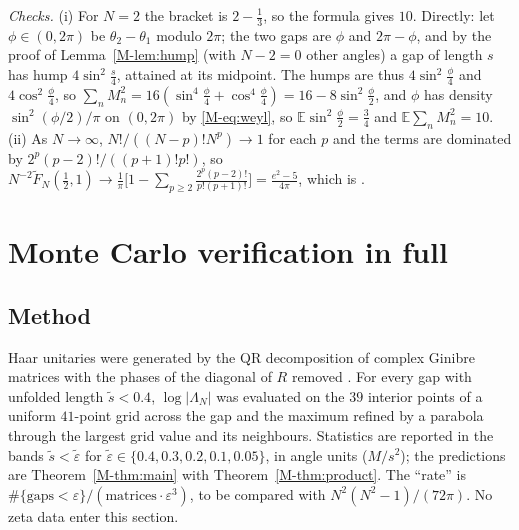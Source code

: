 \documentclass[12pt]{amsart}
\theoremstyle{remark}
\newcommand{\E}{\mathbb{E}}
\newcommand{\eps}{\varepsilon}
\newcommand{\1}{\mathbf{1}}
\begin{document}
\emph{Checks.} (i) For $N=2$ the bracket is $2-\frac13$, so the formula
gives $10$. Directly: let $\phi\in(0,2\pi)$ be $\theta_2-\theta_1$ modulo
$2\pi$; the two gaps are $\phi$ and $2\pi-\phi$, and by
the proof of Lemma~\ref{M-lem:hump} (with $N-2=0$ other angles) a gap of length $s$ has
hump $4\sin^2\frac s4$, attained at its midpoint. The humps are thus
$4\sin^2\frac\phi4$ and $4\cos^2\frac\phi4$, so
$\sum_nM_n^2=16(\sin^4\frac\phi4+\cos^4\frac\phi4)=16-8\sin^2\frac\phi2$,
and $\phi$ has density $\sin^2(\phi/2)/\pi$ on $(0,2\pi)$ by
\eqref{M-eq:weyl}, so $\E\sin^2\frac\phi2=\frac34$ and $\E\sum_nM_n^2=10$.
(ii) As $N\to\infty$, $N!/((N-p)!N^p)\to1$ for each $p$ and the terms are
dominated by $2^p(p-2)!/((p+1)!p!)$, so
$N^{-2}\widetilde F_N(\frac12,1)\to\frac1\pi\big[1-\sum_{p\ge2}
\frac{2^p(p-2)!}{p!(p+1)!}\big]=\frac{e^2-5}{4\pi}$, which is
\cite[(7.8)]{Win12}.

\section{Monte Carlo verification in full}\label{sec:mcsupp}

\subsection*{Method}
Haar unitaries were generated by the QR decomposition of complex Ginibre
matrices with the phases of the diagonal of $R$ removed \cite{Mez07}. For
every gap with unfolded length $\tilde s<0.4$, $\log|\Lambda_N|$ was
evaluated on the $39$ interior points of a uniform $41$-point grid across
the gap and the maximum refined by a parabola through the largest grid
value and its neighbours. Statistics are reported in the bands
$\tilde s<\tilde\eps$ for $\tilde\eps\in\{0.4,0.3,0.2,0.1,0.05\}$, in
angle units ($M/s^2$); the predictions are Theorem~\ref{M-thm:main} with
Theorem~\ref{M-thm:product}. The ``rate'' is
$\#\{\text{gaps}<\eps\}/(\text{matrices}\cdot\eps^3)$, to be compared with
$N^2(N^2-1)/(72\pi)$. No zeta data enter this section.
\end{document}
